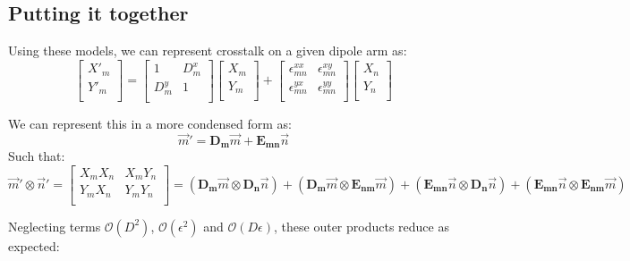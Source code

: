 \documentclass[10pt,a4paper,notitlepage]{article}
\begin{document}
\subsection{Putting it together}
\label{subsec:theory_both}
Using these models, we can represent crosstalk on a given dipole arm as:
\begin{equation}
\begin{bmatrix}
X'_m\\
Y'_m\\
\end{bmatrix}
=
\begin{bmatrix}
1 & D^x_m \\
D^y_m & 1 \\
\end{bmatrix}
\begin{bmatrix}
X_m\\
Y_m\\
\end{bmatrix}
+
\begin{bmatrix}
\epsilon^{xx}_{mn} &\epsilon^{xy}_{mn} \\
\epsilon^{yx}_{mn} &\epsilon^{yy}_{mn} \\
\end{bmatrix}
\begin{bmatrix}
X_n\\
Y_n\\
\end{bmatrix}
\end{equation} 

\noindent We can represent this in a more condensed form as:
\begin{equation}
\vec{m}' = \boldsymbol{D_m}\vec{m} + \boldsymbol{E_{mn}}\vec{n}
\end{equation}
\noindent Such that:
\begin{equation}
\vec{m}'\otimes\vec{n}'
=
\begin{bmatrix}
X_mX_n & X_mY_n \\
Y_mX_n & Y_mY_n\\
\end{bmatrix}
=
(\boldsymbol{D_m}\vec{m} \otimes \boldsymbol{D_n}\vec{n})
+
(\boldsymbol{D_m}\vec{m} \otimes \boldsymbol{E_{nm}}\vec{m})
+
(\boldsymbol{E_{mn}}\vec{n} \otimes \boldsymbol{D_n}\vec{n})
+
(\boldsymbol{E_{mn}}\vec{n} \otimes \boldsymbol{E_{nm}}\vec{m})
\end{equation}

\noindent Neglecting terms $\mathcal{O}(D^2)$, $\mathcal{O}(\epsilon^2)$ and $\mathcal{O}(D\epsilon)$, these outer products reduce as expected:
\end{document}
